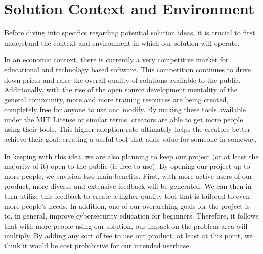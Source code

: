\documentclass[openright]{report}
\begin{document}
\section{Solution Context and Environment}

\par Before diving into specifics regarding potential solution ideas, it is crucial to first understand the context and environment in which our solution will operate.

\par In an economic context, there is currently a very competitive market for educational and technology based software. This competition continues to drive down prices and raise the overall quality of solutions available to the public. Additionally, with the rise of the open source development mentality of the general community, more and more training resources are being created, completely free for anyone to use and modify\cite{open_source}. By making these tools available under the MIT License or similar terms, creators are able to get more people using their tools. This higher adoption rate ultimately helps the creators better achieve their goal: creating a useful tool that adds value for someone in someway.

\par In keeping with this idea, we are also planning to keep our project (or at least the majority of it) open to the public (ie free to use). By opening our project up to more people, we envision two main benefits. First, with more active users of our product, more diverse and extensive feedback will be generated. We can then in turn utilize this feedback to create a higher quality tool that is tailored to even more people's needs. In addition, one of our overarching goals for the project is to, in general, improve cybersecurity education for beginners. Therefore, it follows that with more people using our solution, our impact on the problem area will multiply. By adding any sort of fee to use our product, at least at this point, we think it would be cost prohibitive for our intended userbase.
\end{document}
